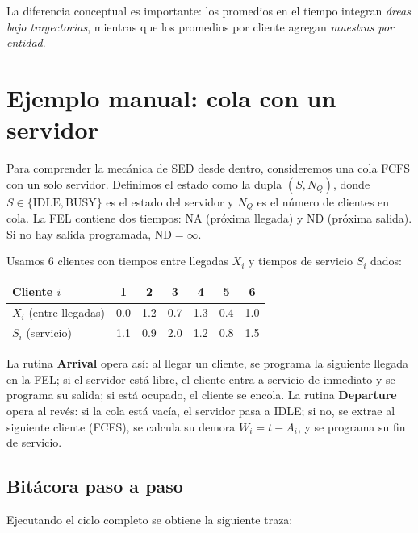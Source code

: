 \documentclass[11pt, letterpaper]{article}
\begin{document}
La diferencia conceptual es importante: los promedios en el tiempo integran \emph{áreas bajo trayectorias}, mientras que los promedios por cliente agregan \emph{muestras por entidad}.


\section{Ejemplo manual: cola con un servidor}

Para comprender la mecánica de SED desde dentro, consideremos una cola FCFS con un solo servidor. Definimos el estado como la dupla $(S, N_Q)$, donde $S \in \{\text{IDLE}, \text{BUSY}\}$ es el estado del servidor y $N_Q$ es el número de clientes en cola. La FEL contiene dos tiempos: NA (próxima llegada) y ND (próxima salida). Si no hay salida programada, $\text{ND} = \infty$.

Usamos 6 clientes con tiempos entre llegadas $X_i$ y tiempos de servicio $S_i$ dados:

\begin{center}
\small
\begin{tabular}{@{}lcccccc@{}}
\toprule
Cliente $i$ & 1 & 2 & 3 & 4 & 5 & 6 \\
\midrule
$X_i$ (entre llegadas) & 0.0 & 1.2 & 0.7 & 1.3 & 0.4 & 1.0 \\
$S_i$ (servicio) & 1.1 & 0.9 & 2.0 & 1.2 & 0.8 & 1.5 \\
\bottomrule
\end{tabular}
\end{center}

La rutina \textbf{Arrival} opera así: al llegar un cliente, se programa la siguiente llegada en la FEL; si el servidor está libre, el cliente entra a servicio de inmediato y se programa su salida; si está ocupado, el cliente se encola. La rutina \textbf{Departure} opera al revés: si la cola está vacía, el servidor pasa a IDLE; si no, se extrae al siguiente cliente (FCFS), se calcula su demora $W_i = t - A_i$, y se programa su fin de servicio.

\subsection{Bitácora paso a paso}

Ejecutando el ciclo completo se obtiene la siguiente traza:
\end{document}
